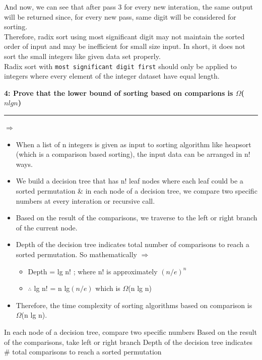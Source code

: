 \documentclass[11pt]{article}
\newcommand\question[3]{\vspace{.25in}\textbf{#1: #2}\vspace{.5em}\hrule\vspace{.10in}}
\begin{document}
And now, we can see that after pass 3 for every new interation, the same output will be returned since, for every new pass, same digit will be considered for sorting. 
\newline \\
Therefore, radix sort using most significant digit may not maintain the sorted order of input and may be inefficient for small size input. In short, it does not sort the small integers like given data set properly. 
\newline \\
Radix sort with \texttt{most significant digit first} should only be applied to integers where every element of the integer dataset have equal length.

\question{4} {Prove that the lower bound of sorting based on comparions is $\Omega$($nlgn$)}

\textbf{Explanation} $\Rightarrow$ 
\begin{itemize}
	\item When a list of n integers is given as input to sorting algorithm like heapsort (which is a comparison based sorting), the input data can be arranged in n! ways.
	\item We build a decision tree that has n! leaf nodes where each leaf could be a sorted permutation \& in each node of a decision tree, we compare two specific numbers at every interation or recursive call.
	\item Based on the result of the comparisons, we traverse to the left or right branch of the current node. 
	\item Depth of the decision tree indicates total number of comparisons to reach a sorted permutation. So mathematically $\Rightarrow$
	\begin{itemize}
		\item Depth = lg n! ; where n! is approximately $(n/e)^n$
		\item $\therefore$ lg n! = n lg$(n/e)$ which is $\Omega$(n lg n)
	\end{itemize}
	\item Therefore, the time complexity of sorting algorithms based on comparison is $\Omega$(n lg n).
\end{itemize}

 
 In each node of a decision tree, compare two specific numbers
 Based on the result of the comparisons, take left or right
branch
 Depth of the decision tree indicates \# total comparisons to
reach a sorted permutation
\end{document}
